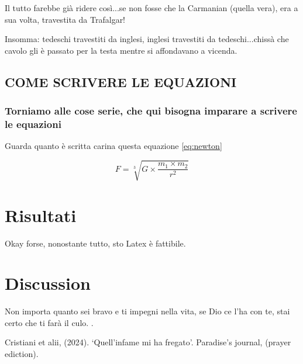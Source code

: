 \documentclass[a4paper, 12pt]{article} %
\begin{document}
\noindent Il tutto farebbe già ridere così...se non fosse che la Carmanian (quella vera), era a sua volta, travestita da Trafalgar!

Insomma: tedeschi travestiti da inglesi, inglesi travestiti da tedeschi...chissà che cavolo gli è passato per la testa mentre si affondavano a vicenda. 

\subsection{COME SCRIVERE LE EQUAZIONI}
\subsubsection{Torniamo alle cose serie, che qui bisogna imparare a scrivere le equazioni}
Guarda quanto è scritta carina questa equazione \ref{eq:newton} %


\begin{equation}
    F = \sqrt[3]{G \times \frac{m_1 \times m_2}{r^2}}
    \label{eq:newton}
\end{equation}

\section{Risultati}
Okay forse, nonostante tutto, sto Latex è fattibile.

\section{Discussion}
Non importa quanto sei bravo e ti impegni nella vita, se Dio ce l'ha con te, stai certo che ti farà il culo.
\citep{Dioburlone}.

\begin{thebibliography}{999}
    Cristiani et alii, (2024). ‘Quell'infame mi ha fregato'. Paradise's journal, (prayer ediction).
\end{thebibliography}
\end{document}
